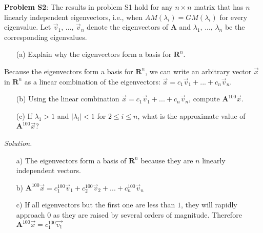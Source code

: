 \documentclass[12pt]{article}
\begin{document}
\noindent \textbf{Problem S2}:  The results in problem S1 hold for any $n\times 
n$ matrix that has $n$ linearly independent eigenvectors, i.e., when 
$AM(\lambda_i) = GM(\lambda_i)$ for every eigenvalue.  Let $\vec{v}_1$, ..., 
$\vec{v}_n$ denote the eigenvectors of $\mathbf{A}$ and $\lambda_1$, ..., 
$\lambda_n$ be the corresponding eigenvalues.  
\begin{itemize}
\item[(a)] Explain why the eigenvectors form a basis for $\mathbf{R}^n$.
\end{itemize}    
Because the eigenvectors form a basis for $\mathbf{R}^n$, we can write an 
arbitrary vector $\vec{x}$ in $\mathbf{R}^n$ as a linear combination of the 
eigenvectors: $\vec{x} = c_1\vec{v}_1+...+c_n\vec{v}_n$. 
\begin{itemize}
\item[(b)] Using the linear combination $\vec{x} = c_1\vec{v}_1+...
+c_n\vec{v}_n$, compute $\mathbf{A}^{100}\vec{x}$. 
\item[(c)] If $\lambda_1>1$ and $|\lambda_i|<1$ for $2\leq i\leq n$, what is the
approximate value of $\mathbf{A}^{100}\vec{x}$? 
\end{itemize} 

\textit{Solution.}
\begin{itemize}
\item[a)] The eigenvectors form a basis of $\mathbf{R}^n$ because they are $n$ linearly independent vectors.
\item[b)] $\mathbf{A}^{100}\vec{x}=c_1^{100}\vec{v}_1+c_2^{100}\vec{v}_2+...+c_n^{100}\vec{v}_n$
\item[c)] If all eigenvectors but the first one are less than $1$, they will rapidly approach $0$ as they are raised by several orders of magnitude. Therefore $\mathbf{A}^{100}\vec{x}=c_1^{100}\vec{v_1}$
\end{itemize}
\end{document}

